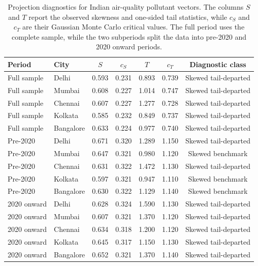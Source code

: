 \documentclass[11pt]{article}
\theoremstyle{plain}
\theoremstyle{definition}
\theoremstyle{remark}
\begin{document}
\begin{table}[H]
\centering
\scriptsize
\caption{Projection diagnostics for Indian air-quality pollutant vectors.  The columns \(S\) and \(T\) report the observed skewness and one-sided tail statistics, while \(c_S\) and \(c_T\) are their Gaussian Monte Carlo critical values.  The full period uses the complete sample, while the two subperiods split the data into pre-2020 and 2020 onward periods.}
\label{tab:air_quality_results}
\begin{tabular}{llccccc}
\toprule
Period & City & \(S\) & \(c_S\) & \(T\) & \(c_T\) & Diagnostic class \\
\midrule
Full sample & Delhi     & 0.593 & 0.231 & 0.893 & 0.739 & Skewed tail-departed \\
Full sample & Mumbai    & 0.608 & 0.227 & 1.014 & 0.747 & Skewed tail-departed \\
Full sample & Chennai   & 0.607 & 0.227 & 1.277 & 0.728 & Skewed tail-departed \\
Full sample & Kolkata   & 0.585 & 0.232 & 0.849 & 0.737 & Skewed tail-departed \\
Full sample & Bangalore & 0.633 & 0.224 & 0.977 & 0.740 & Skewed tail-departed \\
\midrule
Pre-2020 & Delhi     & 0.671 & 0.320 & 1.289 & 1.150 & Skewed tail-departed \\
Pre-2020 & Mumbai    & 0.647 & 0.321 & 0.980 & 1.120 & Skewed benchmark \\
Pre-2020 & Chennai   & 0.631 & 0.322 & 1.472 & 1.130 & Skewed tail-departed \\
Pre-2020 & Kolkata   & 0.597 & 0.321 & 0.947 & 1.110 & Skewed benchmark \\
Pre-2020 & Bangalore & 0.630 & 0.322 & 1.129 & 1.140 & Skewed benchmark \\
\midrule
2020 onward & Delhi     & 0.628 & 0.324 & 1.590 & 1.130 & Skewed tail-departed \\
2020 onward & Mumbai    & 0.607 & 0.321 & 1.370 & 1.120 & Skewed tail-departed \\
2020 onward & Chennai   & 0.634 & 0.318 & 1.200 & 1.120 & Skewed tail-departed \\
2020 onward & Kolkata   & 0.645 & 0.317 & 1.150 & 1.130 & Skewed tail-departed \\
2020 onward & Bangalore & 0.652 & 0.321 & 1.370 & 1.140 & Skewed tail-departed \\
\bottomrule
\end{tabular}
\end{table}
\end{document}
